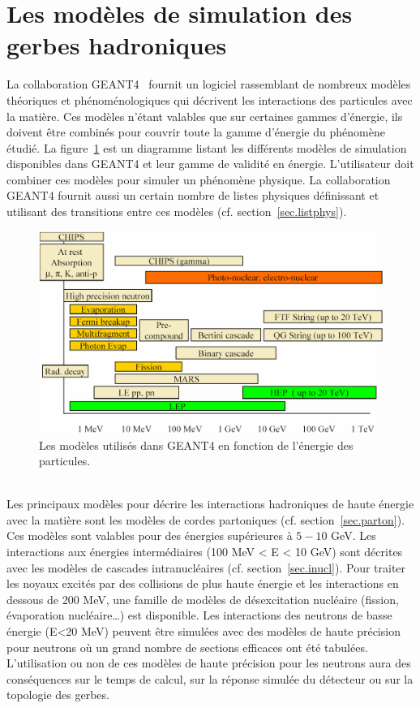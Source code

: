 \section{Les modèles de simulation des gerbes hadroniques}
La collaboration GEANT4~\cite{geant4} fournit un logiciel rassemblant de nombreux modèles théoriques et phénoménologiques qui décrivent les interactions des particules avec la matière. Ces modèles n'étant valables que sur certaines gammes d'énergie, ils doivent être combinés pour couvrir toute la gamme d'énergie du phénomène étudié. La  figure~\ref{fig.model} est un diagramme listant les différents modèles de simulation disponibles dans GEANT4 et leur gamme de validité en énergie. L'utilisateur doit combiner ces modèles pour simuler un phénomène physique. La collaboration GEANT4 fournit aussi un certain nombre de listes physiques définissant et utilisant des transitions entre ces modèles (cf. section~\ref{sec.listphys}).
\begin{figure}[!ht]
  \begin{center}
    \includegraphics[width=.8\textwidth]{Digitizer/figs/HadronicModelsInventory.jpg}
    \caption{Les modèles utilisés dans GEANT4 en fonction de l'énergie des particules.}
    \label{fig.model}
  \end{center}
\end{figure}
\\
Les principaux modèles pour décrire les interactions hadroniques de haute énergie avec la matière sont les modèles de cordes partoniques (cf. section~\ref{sec.parton}). Ces modèles sont valables pour des énergies supérieures à $5-10$ GeV. Les interactions aux énergies intermédiaires (100 MeV < E < 10 GeV) sont décrites avec les modèles de cascades intranucléaires (cf. section~\ref{sec.inucl}). Pour traiter les noyaux excités par des collisions de plus haute énergie et les interactions en dessous de 200 MeV, une famille de modèles de désexcitation nucléaire (fission, évaporation nucléaire\dots) est disponible. Les interactions des neutrons de basse énergie (E<20 MeV) peuvent être simulées avec des modèles de haute précision pour neutrons où un grand nombre de sections efficaces ont été tabulées. L'utilisation ou non de ces modèles de haute précision pour les neutrons aura des conséquences sur le temps de calcul, sur la réponse simulée du détecteur ou sur la topologie des gerbes.
